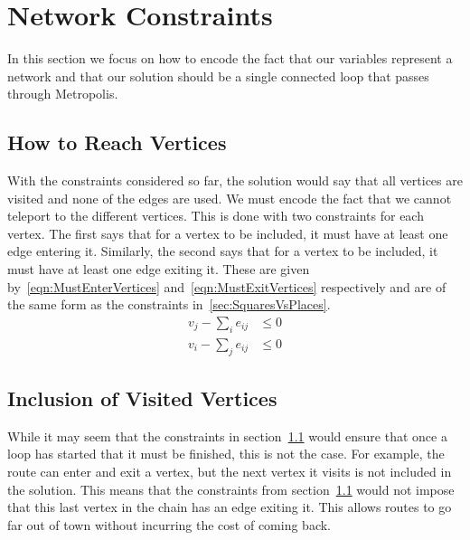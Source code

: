 \section{Network Constraints}
\label{sec:NetworkConstraints}

In this section we focus on how to encode the fact that our variables represent a network and that our solution should be a single connected loop that passes through Metropolis.

\subsection{How to Reach Vertices}
\label{sec:HowToReachVertices}

With the constraints considered so far, the solution would say that all vertices are visited and none of the edges are used. We must encode the fact that we cannot teleport to the different vertices. This is done with two constraints for each vertex. The first says that for a vertex to be included, it must have at least one edge entering it. Similarly, the second says that for a vertex to be included, it must have at least one edge exiting it. These are given by~\eqref{eqn:MustEnterVertices} and~\eqref{eqn:MustExitVertices} respectively and are of the same form as the constraints in~\ref{sec:SquaresVsPlaces}.
\begin{subequations}
	\begin{align}
		v_j - \sum_i e_{ij} &\le 0
		\label{eqn:MustEnterVertices} \\
		v_i - \sum_j e_{ij} &\le 0
		\label{eqn:MustExitVertices}
	\end{align}
\end{subequations}

\subsection{Inclusion of Visited Vertices}
\label{sec:InclusionOfVisitedVertices}

While it may seem that the constraints in section~\ref{sec:HowToReachVertices} would ensure that once a loop has started that it must be finished, this is not the case. For example, the route can enter and exit a vertex, but the next vertex it visits is not included in the solution. This means that the constraints from section~\ref{sec:HowToReachVertices} would not impose that this last vertex in the chain has an edge exiting it. This allows routes to go far out of town without incurring the cost of coming back.


